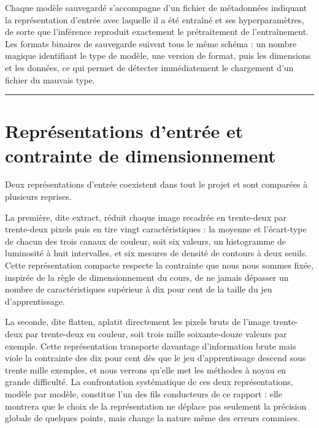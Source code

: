 \documentclass[11pt,a4paper]{report}
\begin{document}
Chaque modèle sauvegardé s'accompagne d'un fichier de métadonnées
indiquant la représentation d'entrée avec laquelle il a été entraîné et
ses hyperparamètres, de sorte que l'inférence reproduit exactement le
prétraitement de l'entraînement. Les formats binaires de sauvegarde
suivent tous le même schéma : un nombre magique identifiant le type de
modèle, une version de format, puis les dimensions et les données, ce
qui permet de détecter immédiatement le chargement d'un fichier du
mauvais type.

\begin{center}\rule{0.5\linewidth}{0.5pt}\end{center}

\hypertarget{repruxe9sentations-dentruxe9e-et-contrainte-de-dimensionnement}{%
\chapter{Représentations d'entrée et contrainte de
dimensionnement}\label{repruxe9sentations-dentruxe9e-et-contrainte-de-dimensionnement}}

Deux représentations d'entrée coexistent dans tout le projet et sont
comparées à plusieurs reprises.

La première, dite extract, réduit chaque image recadrée en trente-deux
par trente-deux pixels puis en tire vingt caractéristiques : la moyenne
et l'écart-type de chacun des trois canaux de couleur, soit six valeurs,
un histogramme de luminosité à huit intervalles, et six mesures de
densité de contours à deux seuils. Cette représentation compacte
respecte la contrainte que nous nous sommes fixée, inspirée de la règle
de dimensionnement du cours, de ne jamais dépasser un nombre de
caractéristiques supérieur à dix pour cent de la taille du jeu
d'apprentissage.

La seconde, dite flatten, aplatit directement les pixels bruts de
l'image trente-deux par trente-deux en couleur, soit trois mille
soixante-douze valeurs par exemple. Cette représentation transporte
davantage d'information brute mais viole la contrainte des dix pour cent
dès que le jeu d'apprentissage descend sous trente mille exemples, et
nous verrons qu'elle met les méthodes à noyau en grande difficulté. La
confrontation systématique de ces deux représentations, modèle par
modèle, constitue l'un des fils conducteurs de ce rapport : elle
montrera que le choix de la représentation ne déplace pas seulement la
précision globale de quelques points, mais change la nature même des
erreurs commises.
\end{document}
